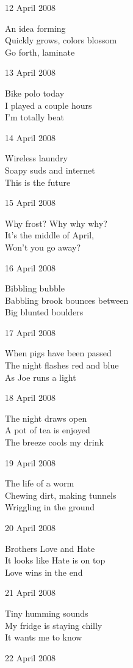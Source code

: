 \documentclass[12pt]{article}
\begin{document}
12 April 2008

An idea forming \\
Quickly grows, colors blossom \\
Go forth, laminate

13 April 2008

Bike polo today \\
I played a couple hours \\
I'm totally beat

14 April 2008

Wireless laundry \\
Soapy suds and internet \\
This is the future

15 April 2008

Why frost? Why why why? \\
It's the middle of April, \\
Won't you go away?

16 April 2008

Bibbling bubble \\
Babbling brook bounces between \\
Big blunted boulders

\newpage

17 April 2008

When pigs have been passed \\
The night flashes red and blue \\
As Joe runs a light

18 April 2008

The night draws open \\
A pot of tea is enjoyed \\
The breeze cools my drink

19 April 2008

The life of a worm \\
Chewing dirt, making tunnels \\
Wriggling in the ground

20 April 2008

Brothers Love and Hate \\
It looks like Hate is on top \\
Love wins in the end

21 April 2008

Tiny humming sounds \\
My fridge is staying chilly \\
It wants me to know

22 April 2008
\end{document}
